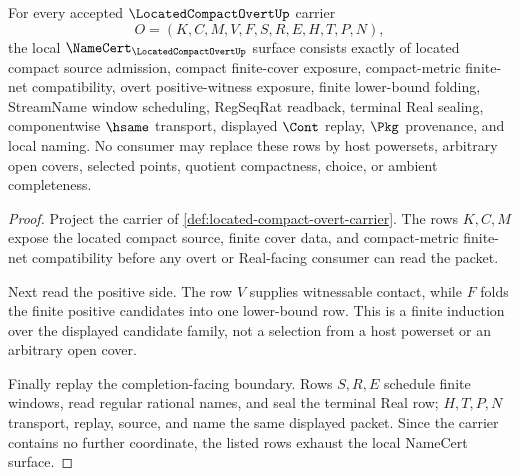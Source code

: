 \begin{theorem}
\label{thm:located-compact-overt-namecert-obligations}
For every accepted $\LocatedCompactOvertUp$ carrier
$$
O=(K,C,M,V,F,S,R,E,H,T,P,N),
$$
the local $\NameCert_{\LocatedCompactOvertUp}$ surface consists exactly of located compact source admission, compact finite-cover exposure, compact-metric finite-net compatibility, overt positive-witness exposure, finite lower-bound folding, StreamName window scheduling, RegSeqRat readback, terminal Real sealing, componentwise $\hsame$ transport, displayed $\Cont$ replay, $\Pkg$ provenance, and local naming. No consumer may replace these rows by host powersets, arbitrary open covers, selected points, quotient compactness, choice, or ambient completeness.
\end{theorem}
\begin{proof}
Project the carrier of \autoref{def:located-compact-overt-carrier}. The rows $K,C,M$ expose the located compact source, finite cover data, and compact-metric finite-net compatibility before any overt or Real-facing consumer can read the packet.

Next read the positive side. The row $V$ supplies witnessable contact, while $F$ folds the finite positive candidates into one lower-bound row. This is a finite induction over the displayed candidate family, not a selection from a host powerset or an arbitrary open cover.

Finally replay the completion-facing boundary. Rows $S,R,E$ schedule finite windows, read regular rational names, and seal the terminal Real row; $H,T,P,N$ transport, replay, source, and name the same displayed packet. Since the carrier contains no further coordinate, the listed rows exhaust the local NameCert surface.
\end{proof}

